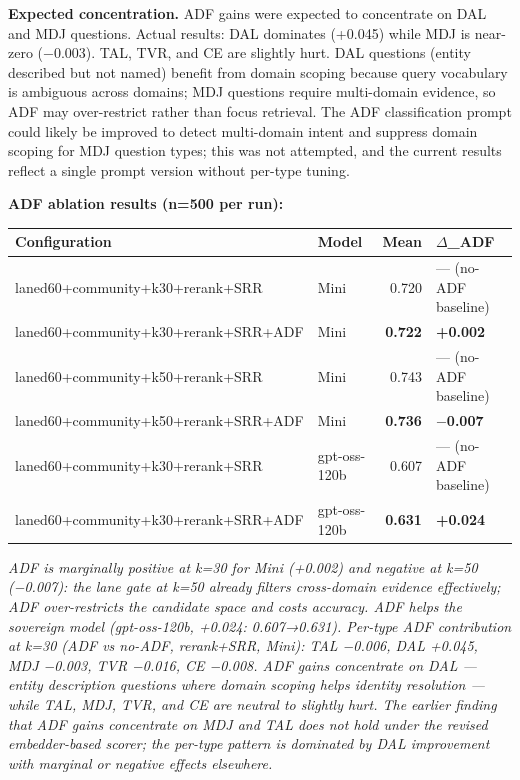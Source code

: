 \documentclass[
]{article}
\begin{document}
\textbf{Expected concentration.} ADF gains were expected to concentrate
on DAL and MDJ questions. Actual results: DAL dominates (+0.045) while
MDJ is near-zero (−0.003). TAL, TVR, and CE are slightly hurt. DAL
questions (entity described but not named) benefit from domain scoping
because query vocabulary is ambiguous across domains; MDJ questions
require multi-domain evidence, so ADF may over-restrict rather than
focus retrieval. The ADF classification prompt could likely be improved
to detect multi-domain intent and suppress domain scoping for MDJ
question types; this was not attempted, and the current results reflect
a single prompt version without per-type tuning.

\textbf{ADF ablation results (n=500 per run):}

\begin{small}
\setlength{\tabcolsep}{4pt}
\begin{longtable}{p{2.4in}p{0.9in}rp{1.2in}}
\toprule
\textbf{Configuration} & \textbf{Model} & \textbf{Mean} & \textbf{$\Delta$\_ADF} \\
\midrule
\endhead
laned60+community+k30+rerank+SRR & Mini & 0.720 & — (no-ADF baseline) \\
laned60+community+k30+rerank+SRR+ADF & Mini & \textbf{0.722} & \textbf{+0.002} \\
laned60+community+k50+rerank+SRR & Mini & 0.743 & — (no-ADF baseline) \\
laned60+community+k50+rerank+SRR+ADF & Mini & \textbf{0.736} & \textbf{$-$0.007} \\
laned60+community+k30+rerank+SRR & gpt-oss-120b & 0.607 & — (no-ADF baseline) \\
laned60+community+k30+rerank+SRR+ADF & gpt-oss-120b & \textbf{0.631} & \textbf{+0.024} \\
\bottomrule
\end{longtable}
\end{small}

\emph{ADF is marginally positive at k=30 for Mini (+0.002) and negative
at k=50 (−0.007): the lane gate at k=50 already filters cross-domain
evidence effectively; ADF over-restricts the candidate space and costs
accuracy. ADF helps the sovereign model (gpt-oss-120b, +0.024:
0.607→0.631). Per-type ADF contribution at k=30 (ADF vs no-ADF,
rerank+SRR, Mini): TAL −0.006, DAL +0.045, MDJ −0.003, TVR −0.016, CE
−0.008. ADF gains concentrate on DAL --- entity description questions
where domain scoping helps identity resolution --- while TAL, MDJ, TVR,
and CE are neutral to slightly hurt. The earlier finding that ADF gains
concentrate on MDJ and TAL does not hold under the revised
embedder-based scorer; the per-type pattern is dominated by DAL
improvement with marginal or negative effects elsewhere.}
\end{document}
